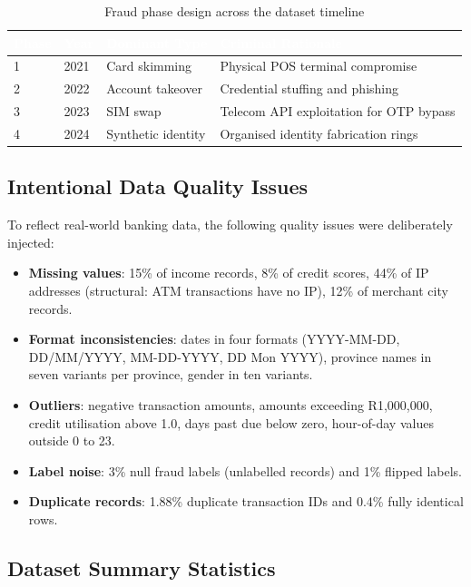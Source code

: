 \documentclass[12pt, a4paper]{article}
\begin{document}
\begin{table}[H]
\centering
\caption{Fraud phase design across the dataset timeline}
\label{tab:phases}
\begin{tabular}{C{1.5cm}C{2cm}C{3cm}C{5cm}}
\toprule
{}
\textcolor{white}{\textbf{Phase}} &
\textcolor{white}{\textbf{Year}} &
\textcolor{white}{\textbf{Dominant Type}} &
\textcolor{white}{\textbf{Criminal Rationale}} \\
 & 2021 & Card skimming & Physical POS terminal compromise \\
2 & 2022 & Account takeover & Credential stuffing and phishing \\
3 & 2023 & SIM swap & Telecom API exploitation for OTP bypass \\
4 & 2024 & Synthetic identity & Organised identity fabrication rings \\
\bottomrule
\end{tabular}
\end{table}

\subsection{Intentional Data Quality Issues}

To reflect real-world banking data, the following quality issues were deliberately injected:

\begin{itemize}[leftmargin=1.5cm]
    \item \textbf{Missing values}: 15\% of income records, 8\% of credit scores, 44\% of IP addresses (structural: ATM transactions have no IP), 12\% of merchant city records.
    \item \textbf{Format inconsistencies}: dates in four formats (YYYY-MM-DD, DD/MM/YYYY, MM-DD-YYYY, DD Mon YYYY), province names in seven variants per province, gender in ten variants.
    \item \textbf{Outliers}: negative transaction amounts, amounts exceeding R1,000,000, credit utilisation above 1.0, days past due below zero, hour-of-day values outside 0 to 23.
    \item \textbf{Label noise}: 3\% null fraud labels (unlabelled records) and 1\% flipped labels.
    \item \textbf{Duplicate records}: 1.88\% duplicate transaction IDs and 0.4\% fully identical rows.
\end{itemize}

\subsection{Dataset Summary Statistics}
\end{document}
